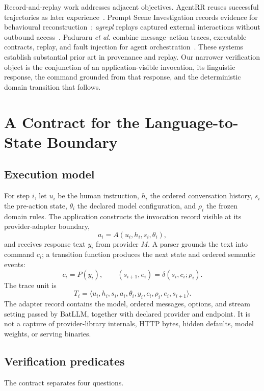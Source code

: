 \documentclass[conference,a4paper]{IEEEtran}
\begin{document}
Record-and-replay work addresses adjacent objectives. AgentRR reuses successful trajectories as later experience~\cite{feng2025agentrr}. Prompt Scene Investigation records evidence for behavioural reconstruction~\cite{ledjaki2026psi}; \emph{agrepl} replays captured external interactions without outbound access~\cite{mudasiru2026agrepl}. Paduraru \emph{et al.} combine message--action traces, executable contracts, replay, and fault injection for agent orchestration~\cite{paduraru2026assurance}. These systems establish substantial prior art in provenance and replay. Our narrower verification object is the conjunction of an application-visible invocation, its linguistic response, the command grounded from that response, and the deterministic domain transition that follows.

\section{A Contract for the Language-to-State Boundary}
\subsection{Execution model}
For step $i$, let $u_i$ be the human instruction, $h_i$ the ordered conversation history, $s_i$ the pre-action state, $\theta_i$ the declared model configuration, and $\rho_i$ the frozen domain rules. The application constructs the invocation record visible at its provider-adapter boundary,
\begin{equation}
 a_i=A(u_i,h_i,s_i,\theta_i),
\end{equation}
and receives response text $y_i$ from provider $M$. A parser grounds the text into command $c_i$; a transition function produces the next state and ordered semantic events:
\begin{equation}
 c_i=P(y_i), \qquad (s_{i+1},e_i)=\delta(s_i,c_i;\rho_i).
\end{equation}
The trace unit is
\begin{equation}
T_i=\langle u_i,h_i,s_i,a_i,\theta_i,y_i,c_i,\rho_i,e_i,s_{i+1}\rangle.
\end{equation}
The adapter record contains the model, ordered messages, options, and stream setting passed by BatLLM, together with declared provider and endpoint. It is not a capture of provider-library internals, HTTP bytes, hidden defaults, model weights, or serving binaries.

\subsection{Verification predicates}
The contract separates four questions.
\end{document}
